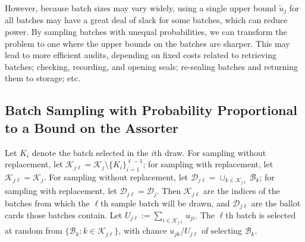 \documentclass[aoas]{imsart}
\newcommand{\cB}{\ensuremath{\mathcal{B}}}
\newcommand{\cD}{\ensuremath{\mathcal{D}}}
\newcommand{\mc}[1]{\ensuremath{\mathcal{#1}}}
\begin{document}
However, because batch sizes may vary widely, using a single upper bound $\widetilde{u}_j$ for all batches may have a great 
deal of slack for some batches, which can reduce power.
By sampling batches with unequal probabilities, we can transform the problem to one where the upper bounds on the
batches are sharper. 
This may lead to more efficient audits, depending on fixed costs related to retrieving batches; checking, recording, and opening seals; 
re-sealing batches and returning them to storage; etc.

\subsection{Batch Sampling with Probability Proportional to a Bound on the Assorter}

Let $K_i$ denote the batch selected in the $i$th draw.
For sampling without replacement, let $\mc{K}_{j\ell} = \mc{K}_j \setminus \{K_i\}_{i=1}^{\ell-1}$; for sampling
with replacement, let $\mc{K}_{j\ell} = \mc{K}_j$.
For sampling without replacement, let $\cD_{j\ell} = \cup_{k \in \mc{K}_{j\ell}} \cB_k$;
for sampling with replacement, let $\cD_{j\ell} = \cD_j$.
Then $\mc{K}_{j\ell}$ are the indices of the batches from which the
$\ell$th sample batch will be drawn, and $\cD_{j\ell}$ are the ballot cards those batches contain.
Let $U_{j\ell} := \sum_{i \in \mc{K}_{j\ell}} u_{ji}$.
The $\ell$th batch is selected at random from $\{\cB_k : k \in \mc{K}_{j\ell} \}$, with chance $u_{jk}/U_{j\ell}$ 
of selecting $\cB_k$.
\end{document}
